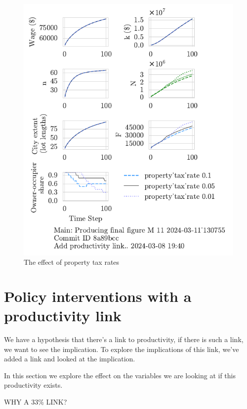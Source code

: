 \begin{figure}[h!tb]
    \centering
    \includegraphics[scale=1.1, trim={0 1.4cm 0 0},clip]{fig/property_tax_rate-Main-130755.pdf}
    \caption{The effect of property tax rates}
    \label{fig:property_tax_ownership_trajectory}
\end{figure}




\newpage
\section{Policy interventions with a productivity link}


We have a hypothesis that there's a link to productivity, if there is such a link, we want to see the implication.
To explore the implications of this link, we've added a link and looked at the implication. 


In this section we explore the effect on the variables we are looking at if this productivity exists. 

{\color{red} WHY A 33\% LINK?}

